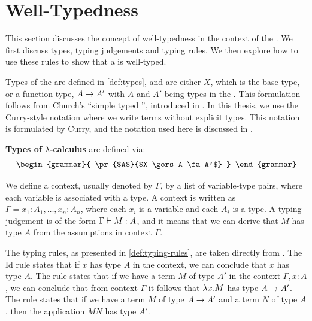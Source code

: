 \section{Well-Typedness}

This section discusses the concept of well-typedness in the context of the \lc.
We first discuss types, typing judgements and typing rules. We then explore how to use these rules to show that a \lterm is well-typed.

Types of the \lc are defined in \cref{def:types}, and are either $X$, which is the base type, or a function type, $A \to A'$ with $A$ and $A'$ being types in the \lc.
This formulation follows from Church's ``simple typed \lc'', introduced in \cite{ALONZOCHURCH1940}.
In this thesis, we use the Curry-style notation where we write terms without explicit types.
This notation is formulated by Curry, and the notation used here is discussed in \cite{barendregt1992lambda}.

\begin{definition}
  \label{def:types}
  \textbf{Types of \boldmath${\lambda}$-calculus} are defined via:
  \begin{align*}
    \begin{grammar}{
      \pr{$A$}{$X \gors A \fa A'$}
 }
    \end{grammar}
  \end{align*}
\end{definition}

We define a context, usually denoted by $\Gamma$, by a list of variable-type pairs, where each variable is associated with a type.
A context is written as $\Gamma = x_1 : A_1, \ldots, x_n : A_n$, where each $x_i$ is a variable and each $A_i$ is a type.
A typing judgement is of the form $\hspace{0.0em} {\Gamma} \vdash {M : A} \hspace{0.0em}$, and it means that we can derive that $M$ has type $A$ from the assumptions in context $\Gamma$.

The typing rules, as presented in \cref{def:typing-rules}, are taken directly from \cite{barendregt1992lambda}. The Id rule states that if $x$ has type $A$ in the context, we can conclude that $x$ has type $A$.
The \impliesi rule states that if we have a term $M$ of type $A'$ in the context $\Gamma, x : A$, we can conclude that from context $\Gamma$ it follows that $\lambda {x}.{M}$ has type $A \to A'$. 
The \impliese rule states that if we have a term $M$ of type $A \to A'$ and a term $N$ of type $A$, then the application $M N$ has type $A'$.

